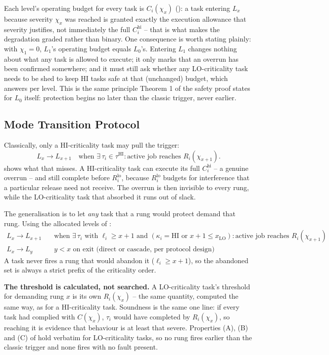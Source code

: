 \documentclass{article}
\begin{document}
Each level's operating budget for every task is $C_i(\chi_x)$
(): a task entering $L_x$ because severity $\chi_x$
was reached is granted exactly the execution allowance that severity
justifies, not immediately the full $C_i^{\mathrm{hi}}$ -- that is what makes
the degradation graded rather than binary. One consequence is worth stating
plainly: with $\chi_1 = 0$, $L_1$'s operating budget equals $L_0$'s. Entering
$L_1$ changes nothing about what any task is allowed to execute; it only marks
that an overrun has been confirmed somewhere; and it must still ask whether any
LO-criticality task needs to be shed to keep HI tasks safe at that (unchanged)
budget, which  answers per level. This is the same
principle Theorem 1 of the safety proof states for $L_0$ itself: protection
begins no later than the classic trigger, never earlier.

\subsection{Mode Transition Protocol}
\label{sec:transition}

Classically, only a HI-criticality task may pull the trigger:
\[
L_x \to L_{x+1} \quad \text{when } \exists\, \tau_i \in \tau^{\mathrm{HI}}:
  \text{active job reaches } R_i(\chi_{x+1}).
\]
 shows what that misses. A HI-criticality task can
execute its full $C_i^{\mathrm{hi}}$ -- a genuine overrun -- and still complete
before $R_i^{\mathrm{lo}}$, because $R_i^{\mathrm{lo}}$ budgets for interference
that a particular release need not receive. The overrun is then invisible to
every rung, while the LO-criticality task that absorbed it runs out of slack.

The generalisation is to let \emph{any} task that a rung would protect demand
that rung. Using the allocated levels of :
\begin{align*}
L_x \to L_{x+1} &\quad \text{when } \exists\, \tau_i \text{ with } \ell_i \geq x+1
  \text{ and } (\kappa_i = \mathrm{HI} \text{ or } x+1 \leq x_{\mathrm{LO}}):
  \text{active job reaches } R_i(\chi_{x+1}) \\
L_x \to L_y &\quad y < x \text{ on exit (direct or cascade, per protocol design)}
\end{align*}
A task never fires a rung that would abandon it ($\ell_i \geq x+1$), so the
abandoned set is always a strict prefix of the criticality order.

\textbf{The threshold is calculated, not searched.} A LO-criticality task's
threshold for demanding rung $x$ is its own $R_i(\chi_x)$ -- the same quantity,
computed the same way, as for a HI-criticality task. Soundness is the same one
line: if every task had complied with $C(\chi_x)$, $\tau_i$ would have completed
by $R_i(\chi_x)$, so reaching it is evidence that behaviour is at least that
severe. Properties (A), (B) and (C) of  hold
verbatim for LO-criticality tasks, so no rung fires earlier than the classic
trigger and none fires with no fault present.
\end{document}
